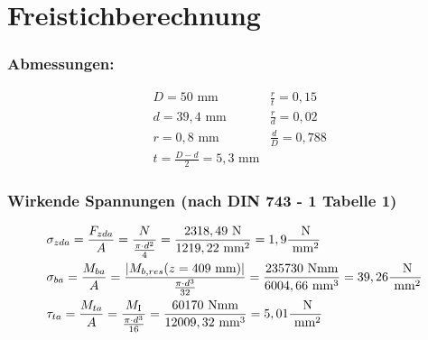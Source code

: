 \section{Freistichberechnung}
\subsubsection{Abmessungen:}
\begin{align*}
	&D= 50 \text{ mm} & \frac{r}{t} = 0,15 \\
	&d= 39,4 \text{ mm} & \frac{r}{d} = 0,02 \\
	& r= 0,8 \text{ mm} & \frac{d}{D} = 0,788 \\
	& t= \frac{D-d}{2} = 5,3 \text{ mm} 
\end{align*}
\subsubsection{Wirkende Spannungen (nach DIN 743 - 1 Tabelle 1)}
\begin{align*}
	&\sigma_{zda} = \frac{F_{zda}}{A} = \frac{N}{\frac{\pi \cdot d^2}{4}} = \frac{2318,49 \text{ N}}{1219,22 \text{ mm}^2} = 1,9 \frac{\text{ N}}{\text{ mm}^2} \\
	&\sigma_{ba} = \frac{M_{ba}}{A} = \frac{|M_{b,res}(z=409 \text{ mm}) |}{\frac{\pi \cdot d^3}{32}} = \frac{235730 \text{ Nmm}}{6004,66 \text{ mm}^3} = 39,26 \frac{\text{ N}}{\text{ mm}^2} \\
	&\tau_{ta} = \frac{M_{ta}}{A} = \frac{M_{\mathrm{I}}}{\frac{\pi \cdot d^3}{16}} = \frac{60170 \text{ Nmm}}{12009,32 \text{ mm}^3} = 5,01 \frac{\text{ N}}{\text{ mm}^2} 
\end{align*}
